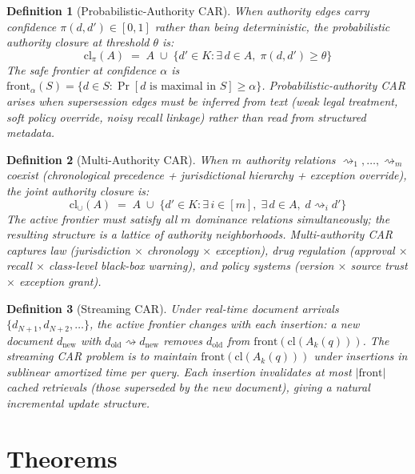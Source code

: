 \documentclass[11pt]{article}
\newtheorem{definition}{Definition}
\begin{document}
\begin{definition}[Probabilistic-Authority CAR]
\label{def:probcar}
When authority edges carry confidence $\pi(d,d') \in [0,1]$ rather than being deterministic, the \emph{probabilistic authority closure} at threshold $\theta$ is:
\[
  \mathrm{cl}_\pi(A) \;=\; A \;\cup\; \{d' \in K : \exists\, d \in A,\; \pi(d,d') \geq \theta\}
\]
The \emph{safe frontier} at confidence $\alpha$ is $\mathrm{front}_\alpha(S) = \{d \in S : \Pr[d \text{ is maximal in } S] \geq \alpha\}$. Probabilistic-authority CAR arises when supersession edges must be inferred from text (weak legal treatment, soft policy override, noisy recall linkage) rather than read from structured metadata.
\end{definition}

\begin{definition}[Multi-Authority CAR]
\label{def:multicar}
When $m$ authority relations $\rightsquigarrow_1, \ldots, \rightsquigarrow_m$ coexist (chronological precedence + jurisdictional hierarchy + exception override), the \emph{joint authority closure} is:
\[
  \mathrm{cl}_{\cup}(A) \;=\; A \;\cup\; \{d' \in K : \exists\, i \in [m],\; \exists\, d \in A,\; d \rightsquigarrow_i d'\}
\]
The active frontier must satisfy all $m$ dominance relations simultaneously; the resulting structure is a lattice of authority neighborhoods. Multi-authority CAR captures law (jurisdiction $\times$ chronology $\times$ exception), drug regulation (approval $\times$ recall $\times$ class-level black-box warning), and policy systems (version $\times$ source trust $\times$ exception grant).
\end{definition}

\begin{definition}[Streaming CAR]
\label{def:streamcar}
Under real-time document arrivals $\{d_{N+1}, d_{N+2}, \ldots\}$, the active frontier changes with each insertion: a new document $d_{\mathrm{new}}$ with $d_{\mathrm{old}} \rightsquigarrow d_{\mathrm{new}}$ removes $d_{\mathrm{old}}$ from $\mathrm{front}(\mathrm{cl}(A_k(q)))$. The \emph{streaming CAR problem} is to maintain $\mathrm{front}(\mathrm{cl}(A_k(q)))$ under insertions in sublinear amortized time per query. Each insertion invalidates at most $|\mathrm{front}|$ cached retrievals (those superseded by the new document), giving a natural incremental update structure.
\end{definition}

\section{Theorems}
\label{sec:theorems}
\end{document}
